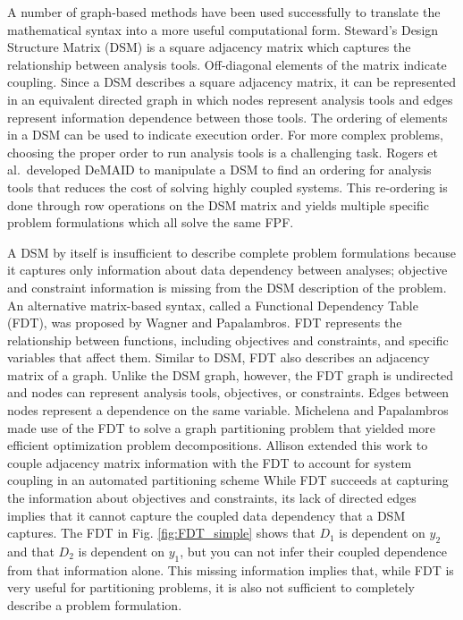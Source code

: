     A number of graph-based methods have been used successfully to translate the 
    mathematical syntax into a more useful computational form. 
    Steward's Design Structure Matrix (DSM) is a square adjacency matrix which captures the relationship between analysis tools.
    Off-diagonal elements of the matrix indicate coupling\cite{Steward1981}. Since a DSM describes a square adjacency matrix, 
    it can be represented in an equivalent directed graph in which nodes represent analysis tools and 
    edges represent information dependence between those tools. The ordering of elements in a DSM can be used to indicate 
    execution order.  For more complex problems, choosing the proper order to run analysis tools is a challenging task. 
    Rogers et al.~developed DeMAID to manipulate a DSM to find an ordering for analysis tools that 
    reduces the cost of solving highly coupled systems\cite{rogers1996,rogers1996demaid}. This re-ordering is done through 
    row operations on the DSM matrix and yields multiple specific problem 
    formulations which all solve the same FPF. 
    
    A DSM by itself is insufficient to describe complete problem formulations because it 
    captures only information about data dependency between analyses; objective and 
    constraint information is missing from the DSM description of the problem. 
    An alternative matrix-based syntax, called a Functional Dependency Table (FDT), was proposed by Wagner and Papalambros. 
    FDT represents the relationship between functions, including objectives and constraints, and specific variables that affect 
    them\cite{Wagner1993}. Similar to DSM, FDT also describes an adjacency matrix of a graph. Unlike the DSM graph, 
    however, the FDT graph is undirected and nodes can represent analysis tools, objectives, 
    or constraints. Edges between nodes represent a dependence on the same 
    variable. Michelena and Papalambros made use of the FDT to solve a graph partitioning problem that yielded 
    more efficient optimization problem decompositions\cite{Michelena1997}. Allison 
    extended this work to couple adjacency matrix information with the FDT to 
    account for system coupling in an automated partitioning scheme\cite{Allison2008} While FDT succeeds at capturing the 
    information about objectives and constraints, its lack of directed edges 
    implies that it cannot capture the coupled data dependency that a DSM captures. 
    The FDT in Fig. \ref{fig:FDT_simple} shows that $D_1$ is dependent on $y_2$ and 
    that $D_2$ is dependent on $y_1$, but you can not infer their coupled dependence from 
    that information alone. This missing information implies 
    that, while FDT is very useful for partitioning problems, it is also not 
    sufficient to completely describe a problem formulation. 

